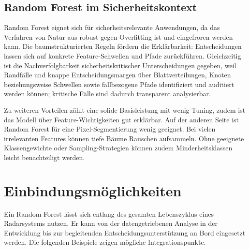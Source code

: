 \subsection*{Random Forest im Sicherheitskontext}

Random Forest eignet sich für sicherheitsrelevante Anwendungen, da das Verfahren von Natur aus 
robust gegen Overfitting ist und eingefroren werden kann. Die baumstrukturierten Regeln fördern die Erklärbarkeit: 
Entscheidungen lassen sich auf konkrete Feature-Schwellen und Pfade zurückführen. 
Gleichzeitig ist die Nachverfolgbarkeit sicherheitskritischer Unterscheidungen gegeben, 
weil Randfälle und knappe Entscheidungsmargen über Blattverteilungen, Knoten beziehungsweise 
Schwellen sowie fallbezogene Pfade identifiziert und auditiert werden können; kritische Fälle sind dadurch transparent analysierbar.

Zu weiteren Vorteilen zählt eine solide Basisleistung mit wenig Tuning, 
zudem ist das Modell über Feature-Wichtigkeiten gut erklärbar. Auf der anderen Seite ist Random Forest 
für eine Pixel-Segmentierung wenig geeignet. Bei vielen irrelevanten Features können tiefe Bäume Rauschen 
aufsammeln. Ohne geeignete Klassengewichte oder Sampling-Strategien können zudem Minderheitsklassen leicht benachteiligt werden.


\section{Einbindungsmöglichkeiten}
Ein Random Forest lässt sich entlang des gesamten Lebenszyklus eines Radarsystems nutzen. 
Er kann von der datengetriebenen Analyse in der Entwicklung bis zur begleitenden Entscheidungsunterstützung an Bord eingesetzt werden. 
Die folgenden Beispiele zeigen mögliche Integrationspunkte.

